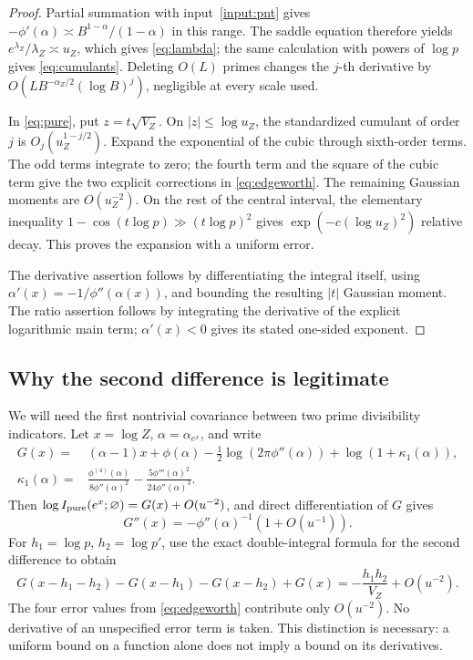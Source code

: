 \begin{proof}
Partial summation with input~\ref{input:pnt} gives
\(-\phi'(\alpha)\asymp B^{1-\alpha}/(1-\alpha)\) in this range.
The saddle equation therefore yields
\(e^{\lambda_Z}/\lambda_Z\asymp u_Z\), which gives
\eqref{eq:lambda}; the same calculation with powers of \(\log p\)
gives \eqref{eq:cumulants}.  Deleting \(O(L)\) primes changes the
\(j\)-th derivative by
\(O(LB^{-\alpha_Z/2}(\log B)^j)\), negligible at every scale used.

In \eqref{eq:pure}, put \(z=t\sqrt{V_Z}\).  On
\(|z|\le\log u_Z\), the standardized cumulant of order \(j\) is
\(O_j(u_Z^{1-j/2})\).  Expand the exponential of the cubic through
sixth-order terms.  The odd terms integrate to zero; the fourth term
and the square of the cubic term give the two explicit corrections
in \eqref{eq:edgeworth}.  The remaining Gaussian moments are
\(O(u_Z^{-2})\).  On the rest of the central interval, the elementary
inequality \(1-\cos(t\log p)\gg(t\log p)^2\) gives
\(\exp(-c(\log u_Z)^2)\) relative decay.  This proves the expansion
with a uniform error.

The derivative assertion follows by differentiating the integral
itself, using \(\alpha'(x)=-1/\phi''(\alpha(x))\), and bounding the
resulting \(|t|\) Gaussian moment.  The ratio assertion follows by
integrating the derivative of the explicit logarithmic main term;
\(\alpha'(x)<0\) gives its stated one-sided exponent.
\end{proof}

\subsection{Why the second difference is legitimate}

We will need the first nontrivial covariance between two prime
divisibility indicators.  Let \(x=\log Z\), \(\alpha=\alpha_{e^x}\),
and write
\begin{align*}
 G(x)={}&(\alpha-1)x+\phi(\alpha)
       -\tfrac12\log(2\pi\phi''(\alpha))
       +\log(1+\kappa_1(\alpha)),\\
 \kappa_1(\alpha)={}&
       \frac{\phi^{(4)}(\alpha)}{8\phi''(\alpha)^2}
       -\frac{5\phi'''(\alpha)^2}{24\phi''(\alpha)^3}.
\end{align*}
Then \(\log I_{\rm pure}(e^x;\varnothing)=G(x)+O(u^{-2})\), and
direct differentiation of \(G\) gives
\[
 G''(x)=-\phi''(\alpha)^{-1}(1+O(u^{-1})).
\]
For \(h_1=\log p\), \(h_2=\log p'\), use the exact double-integral
formula for the second difference to obtain
\begin{equation}\label{eq:second-difference}
 G(x-h_1-h_2)-G(x-h_1)-G(x-h_2)+G(x)
       =-\frac{h_1h_2}{V_Z}+O(u^{-2}).
\end{equation}
The four error values from \eqref{eq:edgeworth} contribute only
\(O(u^{-2})\).  No derivative of an unspecified error term is taken.
This distinction is necessary: a uniform bound on a function alone
does not imply a bound on its derivatives.

